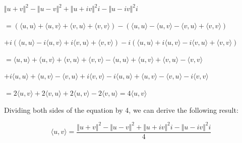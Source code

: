 \documentclass[fleqn]{article}
\begin{document}
\begin{enumerate}[nolistsep]
				$ {\Vert u + v \Vert}^2 - {\Vert u - v \Vert}^2 + {\Vert u + iv \Vert}^2i - {\Vert u - iv \Vert}^2i$
				
				$ = (\langle u, u \rangle + \langle u, v \rangle + \langle v, u \rangle + \langle v, v \rangle)- (\langle u, u \rangle - \langle u, v \rangle - \langle v, u \rangle + \langle v, v \rangle)$
				
				$ + i(\langle u, u \rangle - i\langle u, v \rangle + i\langle v, u \rangle + \langle v, v \rangle) - i(\langle u, u \rangle + i\langle u, v \rangle - i\langle v, u \rangle + \langle v, v \rangle)$
				
				$ = \langle u, u \rangle + \langle u, v \rangle + \langle v, u \rangle + \langle v, v \rangle - \langle u, u \rangle + \langle u, v \rangle + \langle v, u \rangle - \langle v, v \rangle$
				
				$ + i\langle u, u \rangle + \langle u, v \rangle - \langle v, u \rangle + i\langle v, v \rangle - i\langle u, u \rangle + \langle u, v \rangle - \langle v, u \rangle - i\langle v, v \rangle$
				
				$ = 2\langle u, v \rangle + 2\langle v, u \rangle + 2\langle u, v \rangle - 2\langle v, u \rangle = 4\langle u, v \rangle$
				
				\pagebreak
				Dividing both sides of the equation by 4, we can derive the following result:
				
				\begin{equation*}
					\langle u, v \rangle = \frac{{\Vert u + v \Vert}^2 - {\Vert u - v \Vert}^2 + {\Vert u + iv \Vert}^2i - {\Vert u - iv \Vert}^2i}{4}
				\end{equation*}
	\end{enumerate}
\end{document}

